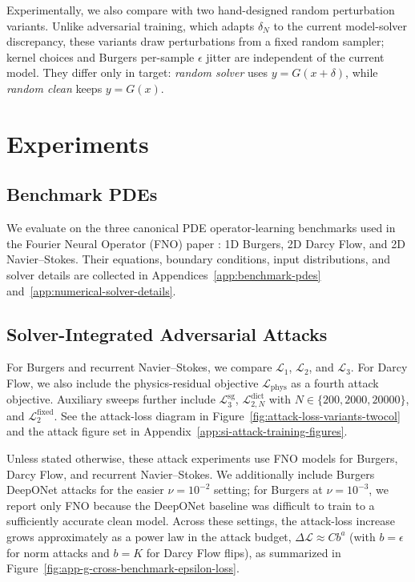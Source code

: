 \documentclass[letterpaper]{article} %
\newcommand{\figref}[1]{Figure~\ref{#1}}
\newcommand{\appref}[1]{Appendix~\ref{#1}}
\newcommand{\apprefs}[2]{Appendices~\ref{#1} and~\ref{#2}}
\begin{document}
Experimentally, we also compare with two hand-designed random perturbation
variants. Unlike adversarial training, which adapts $\delta_N$ to the current
model-solver discrepancy, these variants draw perturbations from a fixed random
sampler; kernel choices and Burgers per-sample $\epsilon$ jitter are independent
of the current model. They differ only in target: \emph{random solver} uses
$y=G(x+\delta)$, while \emph{random clean} keeps $y=G(x)$.

\section{Experiments}

\subsection{Benchmark PDEs}

We evaluate on the three canonical PDE operator-learning benchmarks used in the
Fourier Neural Operator (FNO) paper \citep{li2021fourier}: 1D Burgers, 2D
Darcy Flow, and 2D Navier--Stokes. Their
equations, boundary conditions, input distributions, and solver details are
collected in \apprefs{app:benchmark-pdes}{app:numerical-solver-details}.

\subsection{Solver-Integrated Adversarial Attacks}
\label{subsec:exp-solver-integrated-attacks}

For Burgers and recurrent Navier--Stokes, we compare
$\mathcal{L}_1$, $\mathcal{L}_2$, and $\mathcal{L}_3$. For Darcy Flow, we also
include the physics-residual objective $\mathcal{L}_{\mathrm{phys}}$ as a fourth
attack objective. Auxiliary sweeps further include $\mathcal{L}_3^{\mathrm{sg}}$,
$\mathcal{L}_{2,N}^{\mathrm{dict}}$ with $N\in\{200,2000,20000\}$, and
$\mathcal{L}_2^{\mathrm{fixed}}$. See the attack-loss diagram in
\figref{fig:attack-loss-variants-twocol} and the attack figure set in
\appref{app:si-attack-training-figures}.

Unless stated otherwise, these attack experiments use FNO models for Burgers,
Darcy Flow, and recurrent Navier--Stokes. We additionally include Burgers
DeepONet attacks for the easier $\nu=10^{-2}$ setting; for Burgers at
$\nu=10^{-3}$, we report only FNO because the DeepONet baseline was difficult
to train to a sufficiently accurate clean model. Across these settings, the
attack-loss increase grows approximately as a power law in the attack budget,
$\Delta\mathcal{L}\approx C b^a$ (with $b=\epsilon$ for norm attacks and
$b=K$ for Darcy Flow flips), as summarized in
\figref{fig:app-g-cross-benchmark-epsilon-loss}.
\end{document}
